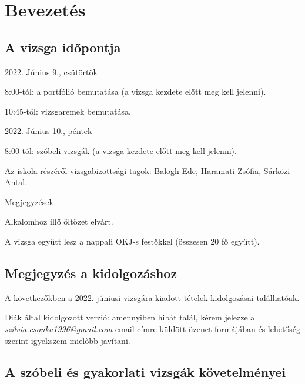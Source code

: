 \chapter{Bevezetés} %
\label{ch:bevezetes}

\section{A vizsga időpontja}

\begin{compactitem}
	\item 2022. Június 9., csütörtök
	\begin{compactitem} 
		\item 8:00-tól: a portfólió bemutatása (a vizsga kezdete előtt meg kell jelenni).
		\item 10:45-től: vizsgaremek bemutatása.
	\end{compactitem}
	
	\item 2022. Június 10., péntek
	\begin{compactitem}
		\item 8:00-tól: szóbeli vizsgák (a vizsga kezdete előtt meg kell jelenni).
		\item Az iskola részéről vizsgabizottsági tagok: Balogh Ede, Haramati Zsófia, Sárközi Antal.
	\end{compactitem}

	\item Megjegyzések
	\begin{compactitem}
		\item Alkalomhoz illő öltözet elvárt.
		\item A vizsga együtt lesz a nappali OKJ-s festőkkel (összesen 20 fő együtt).
	\end{compactitem}
\end{compactitem}

\section{Megjegyzés a kidolgozáshoz}

A következőkben a 2022. júniusi vizsgára kiadott tételek kidolgozásai találhatóak.

Diák által kidolgozott verzió: amennyiben hibát talál, kérem jelezze a \textit{szilvia.csonka1996@gmail.com} email címre küldött üzenet formájában és lehetőség szerint igyekszem mielőbb javítani.

\section{A szóbeli és gyakorlati vizsgák követelményei}

